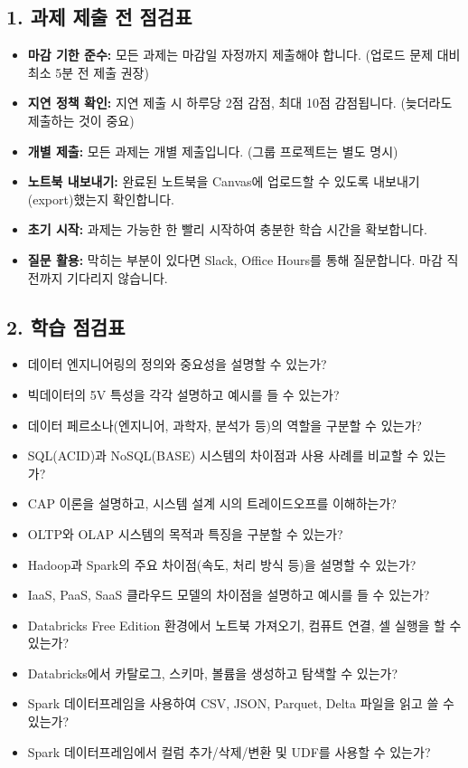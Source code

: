 \documentclass[11pt,a4paper]{article}
\theoremstyle{definition}
\begin{document}
\begin{itemize}
\subsection*{1. 과제 제출 전 점검표}

\begin{itemize}
    \item \textbf{마감 기한 준수:} 모든 과제는 마감일 자정까지 제출해야 합니다. (업로드 문제 대비 최소 5분 전 제출 권장)
    \item \textbf{지연 정책 확인:} 지연 제출 시 하루당 2점 감점, 최대 10점 감점됩니다. (늦더라도 제출하는 것이 중요)
    \item \textbf{개별 제출:} 모든 과제는 개별 제출입니다. (그룹 프로젝트는 별도 명시)
    \item \textbf{노트북 내보내기:} 완료된 노트북을 Canvas에 업로드할 수 있도록 내보내기(export)했는지 확인합니다.
    \item \textbf{초기 시작:} 과제는 가능한 한 빨리 시작하여 충분한 학습 시간을 확보합니다.
    \item \textbf{질문 활용:} 막히는 부분이 있다면 Slack, Office Hours를 통해 질문합니다. 마감 직전까지 기다리지 않습니다.
\end{itemize}

\subsection*{2. 학습 점검표}

\begin{itemize}
    \item 데이터 엔지니어링의 정의와 중요성을 설명할 수 있는가?
    \item 빅데이터의 5V 특성을 각각 설명하고 예시를 들 수 있는가?
    \item 데이터 페르소나(엔지니어, 과학자, 분석가 등)의 역할을 구분할 수 있는가?
    \item SQL(ACID)과 NoSQL(BASE) 시스템의 차이점과 사용 사례를 비교할 수 있는가?
    \item CAP 이론을 설명하고, 시스템 설계 시의 트레이드오프를 이해하는가?
    \item OLTP와 OLAP 시스템의 목적과 특징을 구분할 수 있는가?
    \item Hadoop과 Spark의 주요 차이점(속도, 처리 방식 등)을 설명할 수 있는가?
    \item IaaS, PaaS, SaaS 클라우드 모델의 차이점을 설명하고 예시를 들 수 있는가?
    \item Databricks Free Edition 환경에서 노트북 가져오기, 컴퓨트 연결, 셀 실행을 할 수 있는가?
    \item Databricks에서 카탈로그, 스키마, 볼륨을 생성하고 탐색할 수 있는가?
    \item Spark 데이터프레임을 사용하여 CSV, JSON, Parquet, Delta 파일을 읽고 쓸 수 있는가?
    \item Spark 데이터프레임에서 컬럼 추가/삭제/변환 및 UDF를 사용할 수 있는가?
\end{itemize}


\end{itemize}
\end{document}
